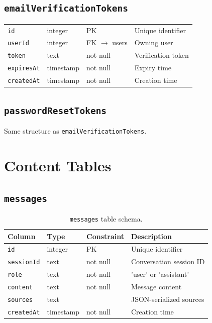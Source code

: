 \subsection{\texttt{emailVerificationTokens}}

\begin{tabular}{llll}
\toprule
\texttt{id} & integer & PK & Unique identifier \\
\texttt{userId} & integer & FK $\to$ users & Owning user \\
\texttt{token} & text & not null & Verification token \\
\texttt{expiresAt} & timestamp & not null & Expiry time \\
\texttt{createdAt} & timestamp & not null & Creation time \\
\bottomrule
\end{tabular}

\subsection{\texttt{passwordResetTokens}}

Same structure as \texttt{emailVerificationTokens}.

\section{Content Tables}
\label{sec:schema:content}

\subsection{\texttt{messages}}

\begin{longtable}{lllp{4cm}}
\caption{\texttt{messages} table schema.} \label{tab:schema-messages} \\
\toprule
\textbf{Column} & \textbf{Type} & \textbf{Constraint} & \textbf{Description} \\
\midrule
\endfirsthead
\texttt{id} & integer & PK & Unique identifier \\
\texttt{sessionId} & text & not null & Conversation session ID \\
\texttt{role} & text & not null & 'user' or 'assistant' \\
\texttt{content} & text & not null & Message content \\
\texttt{sources} & text & & JSON-serialized sources \\
\texttt{createdAt} & timestamp & not null & Creation time \\
\bottomrule
\end{longtable}

